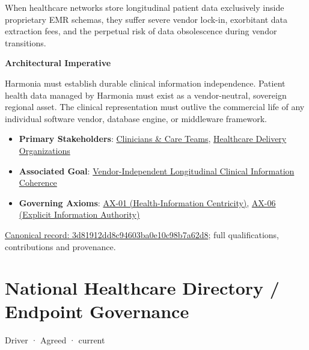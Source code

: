 When healthcare networks store longitudinal patient data exclusively inside proprietary EMR schemas, they suffer severe vendor lock-in, exorbitant data extraction fees, and the perpetual risk of data obsolescence during vendor transitions.



\par\medskip\textbf{Architectural Imperative}\par


Harmonia must establish durable clinical information independence. Patient health data managed by Harmonia must exist as a vendor-neutral, sovereign regional asset. The clinical representation must outlive the commercial life of any individual software vendor, database engine, or middleware framework.



\begin{itemize}


\item \textbf{Primary Stakeholders}: \href{\detokenize{../../../../../docs/markdown/01-motivation/stakeholders/enterprise-stakeholders.md}}{Clinicians \& Care Teams}, \href{\detokenize{../../../../../docs/markdown/01-motivation/stakeholders/enterprise-stakeholders.md}}{Healthcare Delivery Organizations}

\item \textbf{Associated Goal}: \href{\detokenize{../../../../../docs/markdown/01-motivation/goals-outcomes/strategic-goals.md}}{Vendor-Independent Longitudinal Clinical Information Coherence}

\item \textbf{Governing Axioms}: \hyperref[element:e9bd61acaaea4577bc4086a5639e52c3]{AX-01 (Health-Information Centricity)}, \hyperref[element:952c3b6148ce4fce94b69f99a0c2fec7]{AX-06 (Explicit Information Authority)}

\end{itemize}

{\footnotesize \href{../../../../continuum/motivation/driver/3d81912dd8c94603ba0e10c98b7a62d8.md}{Canonical record: 3d81912dd8c94603ba0e10c98b7a62d8}; full qualifications, contributions and provenance.}\par
\section{National Healthcare Directory / Endpoint Governance}

\label{element:5ea7e57dcde04ef88c19a88ade9af6ca}
{\small Driver · Agreed · current}\par

